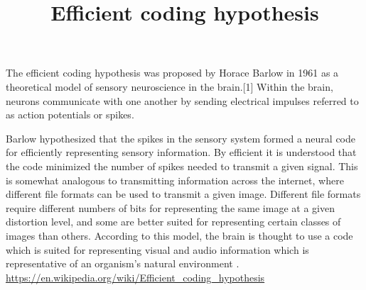 \documentclass[a4paper]{standalone}
\title{Efficient coding hypothesis}
\begin{document}
    \maketitle
    The efficient coding hypothesis was proposed by Horace Barlow in 1961 as a theoretical model of sensory neuroscience in the brain.[1] Within the brain, neurons communicate with one another by sending electrical impulses referred to as action potentials or spikes.
    
    Barlow hypothesized that the spikes in the sensory system formed a neural code for efficiently representing sensory information. By efficient it is understood that the code minimized the number of spikes needed to transmit a given signal. This is somewhat analogous to transmitting information across the internet, where different file formats can be used to transmit a given image. Different file formats require different numbers of bits for representing the same image at a given distortion level, and some are better suited for representing certain classes of images than others. According to this model, the brain is thought to use a code which is suited for representing visual and audio information which is representative of an organism's natural environment .
    \url{https://en.wikipedia.org/wiki/Efficient_coding_hypothesis}
\end{document}
